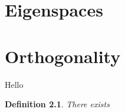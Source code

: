 \documentclass{amsbook}
\newtheorem{defn}{Definition}
\begin{document}
\chapter{Eigenspaces}
\chapter{Orthogonality}

Hello
\begin{defn}
  There exists
\end{defn}
\end{document}
